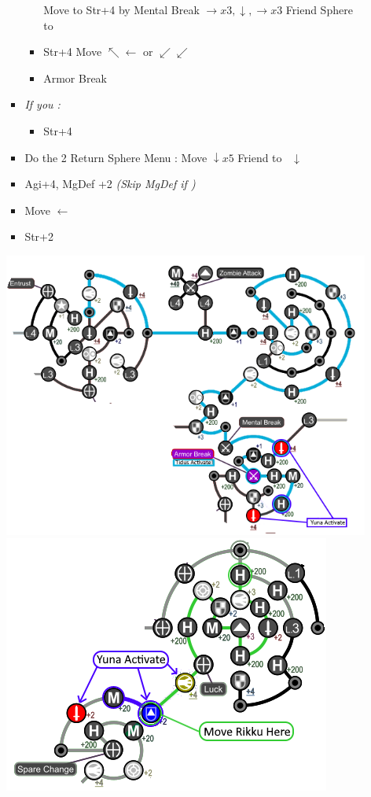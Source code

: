 \begin{spheregrid}
\begin{multicols}{2}
\begin{itemize}
\begin{itemize}
\begin{itemize}
\begin{itemize}
						            \tidusf Move to Str+4 by Mental Break $\rightarrow x3, \downarrow, \rightarrow x3$
						            \yunaf Friend Sphere to \tidus
						            \item Str+4
						                  \tidusf Move $\nwarrow\leftarrow$ or $\swarrow\swarrow$
						            \item Armor Break
					            \end{itemize}
					      \item \textit{If you \lostblitz:}
					            \begin{itemize}
						            \tidusf Move to Armor Break $\rightarrow x3, \downarrow x6$
						            \tidusf Armor Break
						            \tidusf Move to HP $\searrow\searrow$
						            \yunaf Friend Sphere to \tidus
						            \item Str+4
					            \end{itemize}
					      \item Do the 2 Return Sphere Menu
					            \rikkuf: Move $\downarrow x5$
					            \yunaf Friend to \rikku\ $\downarrow$
					      \item Agi+4, MgDef +2 \textit{(Skip MgDef if \blitzloss)}
					      \item Move $\leftarrow$
					      \item Str+2
				      \end{itemize}
				      \includegraphics[width=.8\columnwidth]{graphics/post_BY_0_returns}
				      \includegraphics[width=.8\columnwidth]{graphics/0_returns_pt2}

\end{itemize}
\end{itemize}
\end{multicols}
\end{spheregrid}
